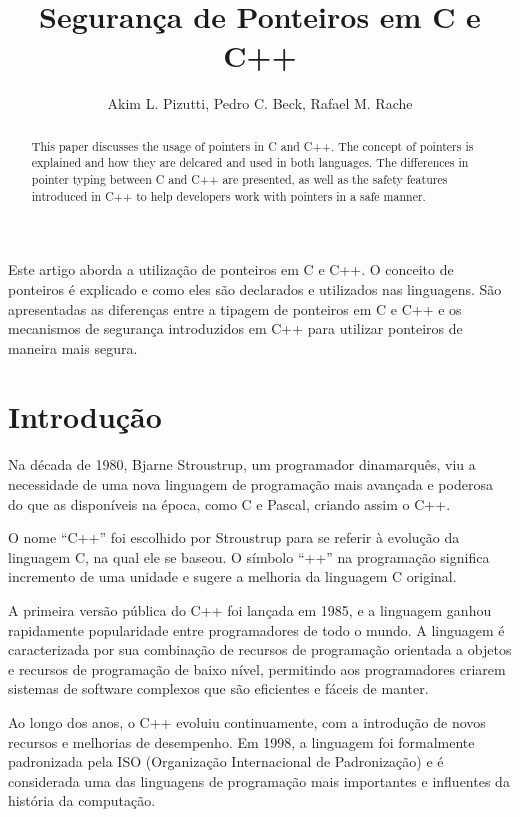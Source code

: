 \documentclass[12pt]{article}
\title{Segurança de Ponteiros em C e C++}
\author{Akim L. Pizutti, Pedro C. Beck, Rafael M. Rache}
\begin{document}
 

\maketitle

\begin{abstract}
This paper discusses the usage of pointers in C and C++. The concept of pointers is explained and how they are delcared and used in both languages. The differences in pointer typing between C and C++ are presented, as well as the safety features introduced in C++ to help developers work with pointers in a safe manner.
\end{abstract}
     
\begin{resumo} 
Este artigo aborda a utilização de ponteiros em C e C++. O conceito de ponteiros é explicado e como eles são declarados e utilizados nas linguagens. São apresentadas as diferenças entre a tipagem de ponteiros em C e C++ e os mecanismos de segurança introduzidos em C++ para utilizar ponteiros de maneira mais segura.
\end{resumo}


\section{Introdução}

Na década de 1980, Bjarne Stroustrup, um programador dinamarquês, viu a necessidade de uma nova linguagem de programação mais avançada e poderosa do que as disponíveis na época, como C e Pascal, criando assim o C++.

O nome ``C++'' foi escolhido por Stroustrup para se referir à evolução da linguagem C, na qual ele se baseou. O símbolo ``++'' na programação significa incremento de uma unidade e sugere a melhoria da linguagem C original.

A primeira versão pública do C++ foi lançada em 1985, e a linguagem ganhou rapidamente popularidade entre programadores de todo o mundo. A linguagem é caracterizada por sua combinação de recursos de programação orientada a objetos e recursos de programação de baixo nível, permitindo aos programadores criarem sistemas de software complexos que são eficientes e fáceis de manter.

Ao longo dos anos, o C++ evoluiu continuamente, com a introdução de novos recursos e melhorias de desempenho. Em 1998, a linguagem foi formalmente padronizada pela ISO (Organização Internacional de Padronização) e é considerada uma das linguagens de programação mais importantes e influentes da história da computação.
\end{document}
